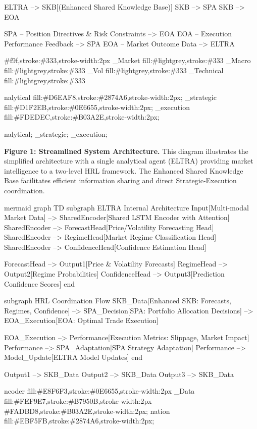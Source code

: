 \documentclass[11pt]{article}
\begin{document}
    ELTRA --> SKB[(Enhanced Shared Knowledge Base)]
    SKB --> SPA
    SKB --> EOA
    
    SPA -- Position Directives \& Risk Constraints --> EOA
    EOA -- Execution Performance Feedback --> SPA
    EOA -- Market Outcome Data --> ELTRA

    \#f9f,stroke:\#333,stroke-width:2px
    \_Market fill:\#lightgrey,stroke:\#333
    \_Macro fill:\#lightgrey,stroke:\#333
    \_Vol fill:\#lightgrey,stroke:\#333
    \_Technical fill:\#lightgrey,stroke:\#333

    nalytical fill:\#D6EAF8,stroke:\#2874A6,stroke-width:2px;
    \_strategic fill:\#D1F2EB,stroke:\#0E6655,stroke-width:2px;
    \_execution fill:\#FDEDEC,stroke:\#B03A2E,stroke-width:2px;

    nalytical;
    \_strategic;
    \_execution;

\textbf{Figure 1: Streamlined System Architecture.} This diagram illustrates the simplified architecture with a single analytical agent (ELTRA) providing market intelligence to a two-level HRL framework. The Enhanced Shared Knowledge Base facilitates efficient information sharing and direct Strategic-Execution coordination.

mermaid
graph TD
    subgraph ELTRA Internal Architecture
        Input[Multi-modal Market Data] --> SharedEncoder[Shared LSTM Encoder with Attention]
        SharedEncoder --> ForecastHead[Price/Volatility Forecasting Head]
        SharedEncoder --> RegimeHead[Market Regime Classification Head]
        SharedEncoder --> ConfidenceHead[Confidence Estimation Head]
        
        ForecastHead --> Output1[Price \& Volatility Forecasts]
        RegimeHead --> Output2[Regime Probabilities]
        ConfidenceHead --> Output3[Prediction Confidence Scores]
    end

    subgraph HRL Coordination Flow
        SKB\_Data[Enhanced SKB: Forecasts, Regimes, Confidence] 
        --> SPA\_Decision[SPA: Portfolio Allocation Decisions]
        --> EOA\_Execution[EOA: Optimal Trade Execution]
        
        EOA\_Execution --> Performance[Execution Metrics: Slippage, Market Impact]
        Performance --> SPA\_Adaptation[SPA Strategy Adaptation]
        Performance --> Model\_Update[ELTRA Model Updates]
    end

    Output1 --> SKB\_Data
    Output2 --> SKB\_Data
    Output3 --> SKB\_Data

    ncoder fill:\#E8F6F3,stroke:\#0E6655,stroke-width:2px
    \_Data fill:\#FEF9E7,stroke:\#B7950B,stroke-width:2px
    \#FADBD8,stroke:\#B03A2E,stroke-width:2px;
    nation fill:\#EBF5FB,stroke:\#2874A6,stroke-width:2px;
    
\end{document}
